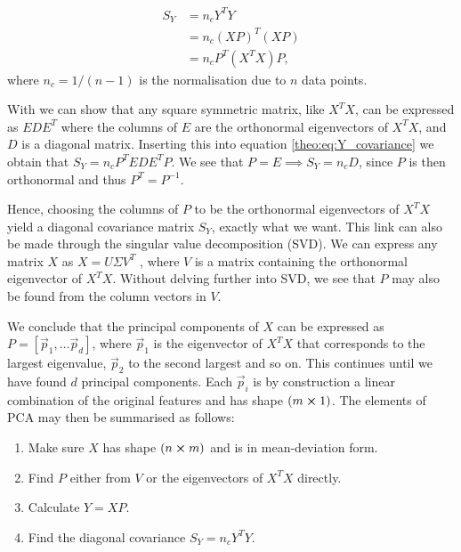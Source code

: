     \begin{align}\label{theo:eq:Y_covariance}
        S_Y &= n_cY^TY\nonumber\\
        &= n_c(XP)^T(XP) \nonumber\\
        &= n_cP^T(X^TX)P,
    \end{align} 
    where $n_c = 1/(n-1)$ is the normalisation due to $n$ data points.

    With \citep[ch. 5.3]{linalgbok} we can show that any square symmetric matrix, like $X^TX$, can be expressed as $EDE^T$ where the columns of $E$ are the orthonormal eigenvectors of $X^TX$, and $D$ is a diagonal matrix. Inserting this into equation  \ref{theo:eq:Y_covariance} we obtain that $S_Y = n_cP^TEDE^TP$. We see that $P=E \implies S_Y=n_c D$\footnotemark, since $P$ is then orthonormal and thus $P^T=P^{-1}$.


    Hence, choosing the columns of $P$ to be the orthonormal eigenvectors of $X^TX$ yield a diagonal covariance matrix $S_Y$, exactly what we want. This link can also be made through the singular value decomposition (SVD). We can express any matrix $X$ as $X=U\Sigma V^T$ \citep[ch. 7.4]{linalgbok}, where $V$ is a matrix containing the orthonormal eigenvector of $X^TX$. Without delving further into SVD, we see that $P$ may also be found from the column vectors in $V$. 
    
    We conclude that the principal components of $X$ can be expressed as $P=[\vec{p}_1, \dots \vec{p}_d]$, where $\vec{p}_1$ is the eigenvector of $X^TX$ that corresponds to the largest eigenvalue, $\vec{p}_2$ to the second largest and so on. This continues until we have found $d$ principal components. Each $\vec{p}_i$ is by construction a linear combination of the original features and has shape $(m\cross 1)$.   The elements of PCA may then be summarised as follows:

    \begin{enumerate}
        \item Make sure $X$ has shape $(n\cross m)$ and is in mean-deviation form.
        \item Find $P$ either from $V$ or the eigenvectors of $X^TX$ directly.
        \item Calculate $Y=XP$.
        \item Find the diagonal covariance $S_Y=n_cY^TY$.
    \end{enumerate}
    
